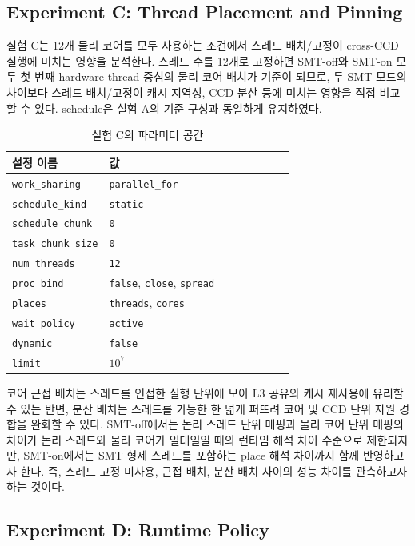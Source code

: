 \documentclass[11pt,a4paper]{article}
\begin{document}
\subsection{Experiment C: Thread Placement and Pinning}

실험 C는 12개 물리 코어를 모두 사용하는 조건에서 스레드 배치/고정이 cross-CCD 실행에 미치는 영향을 분석한다. 스레드 수를 12개로 고정하면 SMT-off와 SMT-on 모두 첫 번째 hardware thread 중심의 물리 코어 배치가 기준이 되므로, 두 SMT 모드의 차이보다 스레드 배치/고정이 캐시 지역성, CCD 분산 등에 미치는 영향을 직접 비교할 수 있다. schedule은 실험 A의 기준 구성과 동일하게 유지하였다.

\begin{table}[h]
\centering
\begin{tabular}{lp{0.70\linewidth}}
\toprule
설정 이름 & 값 \\
\midrule
\texttt{work\_sharing} & \texttt{parallel\_for} \\
\texttt{schedule\_kind} & \texttt{static} \\
\texttt{schedule\_chunk} & \texttt{0} \\
\texttt{task\_chunk\_size} & \texttt{0} \\
\texttt{num\_threads} & \texttt{12} \\
\texttt{proc\_bind} & \texttt{false}, \texttt{close}, \texttt{spread} \\
\texttt{places} & \texttt{threads}, \texttt{cores} \\
\texttt{wait\_policy} & \texttt{active} \\
\texttt{dynamic} & \texttt{false} \\
\texttt{limit} & $10^7$ \\
\bottomrule
\end{tabular}
\caption{실험 C의 파라미터 공간}
\label{tab:expC-combos}
\end{table}

코어 근접 배치는 스레드를 인접한 실행 단위에 모아 L3 공유와 캐시 재사용에 유리할 수 있는 반면, 분산 배치는 스레드를 가능한 한 넓게 퍼뜨려 코어 및 CCD 단위 자원 경합을 완화할 수 있다. SMT-off에서는 논리 스레드 단위 매핑과 물리 코어 단위 매핑의 차이가 논리 스레드와 물리 코어가 일대일일 때의 런타임 해석 차이 수준으로 제한되지만, SMT-on에서는 SMT 형제 스레드를 포함하는 place 해석 차이까지 함께 반영하고자 한다. 즉, 스레드 고정 미사용, 근접 배치, 분산 배치 사이의 성능 차이를 관측하고자 하는 것이다.

\subsection{Experiment D: Runtime Policy}
\end{document}
